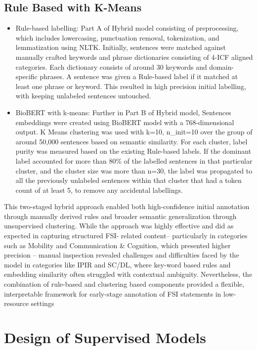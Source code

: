 \subsection{Rule Based with K-Means}

\begin{itemize}
    \item Rule-based labelling: Part A of Hybrid model consisting of preprocessing, which includes lowercasing, punctuation removal, tokenization, and lemmatization using NLTK. Initially, sentences were matched against manually crafted keywords and phrase dictionaries consisting of 4-ICF aligned categories. Each dictionary consists of around 30 keywords and domain-specific phrases. A sentence was given a Rule-based label if it matched at least one phrase or keyword. This resulted in high precision initial labelling, with keeping unlabeled sentences untouched. 
    \item BioBERT with k-means: Further in Part B of Hybrid model, Sentences embeddings were created using BioBERT model with a 768-dimensional output. K Means clustering was used with k=10, n\_init=10 over the group of around 50,000 sentences based on semantic similarity. For each cluster, label purity was measured based on the existing Rule-based labels. If the dominant label accounted for more than 80\% of the labelled sentences in that particular cluster, and the cluster size was more than n=30, the label was propagated to all the previously unlabeled sentences within that cluster that had a token count of at least 5, to remove any accidental labellings. \\
\end{itemize}
This two-staged hybrid approach enabled both high-confidence initial annotation through manually derived rules and broader semantic generalization through unsupervised clustering. While the approach was highly effective and did as expected in capturing structured FSI- related content– particularly in categories such as Mobility and Communication \& Cognition, which presented higher precision – manual inspection revealed challenges and difficulties faced by the model in categories like IPIR and SC/DL, where key-word based rules and embedding similarity often struggled with contextual ambiguity. Nevertheless, the combination of rule-based and clustering based components provided a flexible, interpretable framework for early-stage annotation of FSI statements in low-resource settings

 
\section{Design of Supervised Models}

